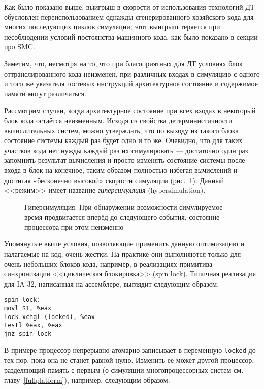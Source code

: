 

Как было показано выше, выигрыш в скорости от использования технологий ДТ обусловлен переиспользованием однажды сгенерированного хозяйского кода для многих последующих циклов симуляции; этот выигрыш теряется при несоблюдении условий постоянства машинного кода, как было показано в секции про SMC. 

Заметим, что, несмотря на то, что при благоприятных для ДТ условиях блок оттранслированного кода неизменен, при различных входах в симуляцию с одного и того же указателя гостевых инструкций архитектурное состояние и содержимое памяти могут различаться. 

Рассмотрим случаи, когда архитектурное состояние при всех входах в некоторый блок кода остаётся неизменным. Исходя из свойства детерминистичности вычислительных систем, можно утверждать, что по выходу из такого блока состояние системы каждый раз будет одно и то же. Очевидно, что для таких участков кода нет нужды каждый раз их симулировать --- достаточно один раз запомнить результат вычисления и просто изменять состояние системы после входа в блок на конечное, таким образом полностью избегая вычислений и достигая «бесконечно высокой» скорости симуляции (рис.~\ref{fig:hypersim}). Данный <<режим>> имеет название \textit{гиперсимуляция} (\abbr hypersimulation).

\begin{figure}[htb]
    \centering
    \caption[Гиперсимуляция]{Гиперсимуляция. При обнаружении возможности симулируемое время продвигается вперёд до следующего события, состояние процессора при этом неизменно}
    \label{fig:hypersim}
\end{figure}

Упомянутые выше условия, позволяющие применить данную оптимизацию и налагаемые на код, очень жестки. На практике они выполняются только для очень небольших блоков кода, например, в реализациях примитива синхронизации <<циклическая блокировка>> (\abbr spin lock). Типичная реализация для IA-32, написанная на ассемблере, выглядит следующим образом:

\begin{lstlisting}
spin_lock:
movl $1, %eax
lock xchgl (locked), %eax
testl %eax, %eax
jnz spin_lock
\end{lstlisting}

В примере процессор непрерывно атомарно записывает в переменную \texttt{locked} до тех пор, пока она не станет равной нулю. Изменить её может другой процессор, разделяющий память с первым (о симуляции многопроцессорных систем см. главу~\ref{fullplatform}), например, следующим образом:

